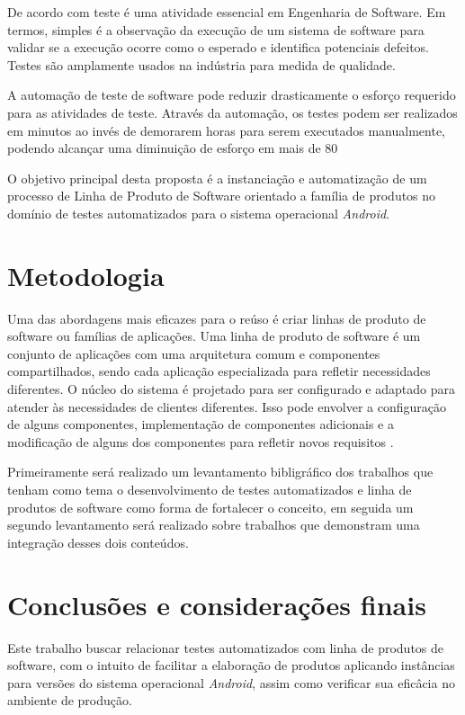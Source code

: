 \documentclass[12pt,a4paper]{article}
\begin{document}
De acordo com \cite{bertolino2007} teste é uma atividade essencial em Engenharia de Software. Em termos, simples é a observação da execução de um sistema de software para validar se a execução ocorre como o esperado e identifica potenciais defeitos. Testes são amplamente usados na indústria para medida de qualidade.

A automação de teste de software pode reduzir drasticamente o esforço requerido para as atividades de teste. Através da automação, os testes podem ser realizados em minutos ao invés de demorarem horas para serem executados manualmente, podendo alcançar uma diminuição de esforço em mais de 80%

O objetivo principal desta proposta é a instanciação e automatização de um processo de Linha de Produto de Software orientado a família de produtos no domínio de testes automatizados para o sistema operacional \textit{Android}.
\section{Metodologia}
Uma das abordagens mais eficazes para o reúso é criar linhas de produto de software ou famílias de aplicações. Uma linha de produto de software é um conjunto de aplicações com uma arquitetura comum e componentes compartilhados, sendo cada aplicação especializada para refletir necessidades diferentes. O núcleo do sistema é projetado para ser configurado e adaptado para atender às necessidades de clientes diferentes. Isso pode envolver a configuração de alguns componentes, implementação de componentes adicionais e a modificação de alguns dos componentes para refletir novos requisitos \cite{Sommerville2011}.

Primeiramente será realizado um levantamento bibligráfico dos trabalhos que tenham como tema o desenvolvimento de testes automatizados e linha de produtos de software como forma de fortalecer o conceito, em seguida um segundo levantamento será realizado sobre trabalhos que demonstram uma integração desses dois conteúdos.

\section{Conclusões e considerações finais}
Este trabalho buscar relacionar testes automatizados com linha de produtos de software, com o intuito de facilitar a elaboração de produtos aplicando instâncias para versões do sistema operacional \textit{Android}, assim como verificar sua eficâcia no ambiente de produção.

\newpage


\end{document}

